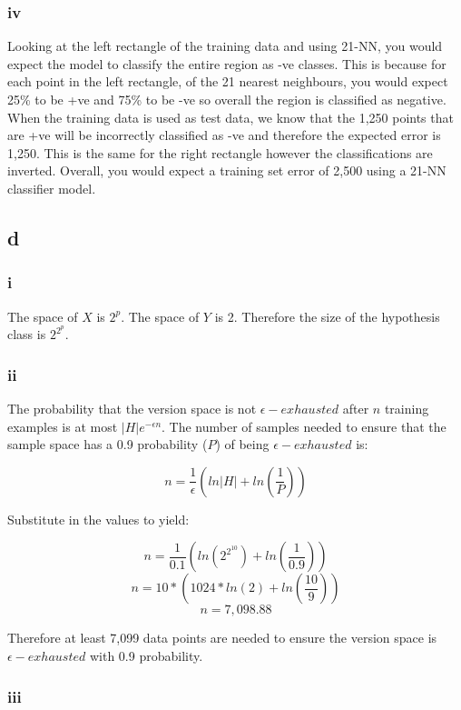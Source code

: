 \documentclass{article}
\begin{document}
\subsubsection*{iv}

Looking at the left rectangle of the training data and using 21-NN, you would expect the model to classify the entire region as -ve classes. 
This is because for each point in the left rectangle, of the 21 nearest neighbours, you would expect 25\% to be +ve and 75\% to be -ve so
overall the region is classified as negative. When the training data is used as test data, we know that the 1,250 points that are +ve will 
be incorrectly classified as -ve and therefore the expected error is 1,250. This is the same for the right rectangle however the classifications
are inverted. Overall, you would expect a training set error of 2,500 using a 21-NN classifier model.

\subsection*{d}

\subsubsection*{i}
The space of \(X\) is \(2^{p}\). The space of \(Y\) is 2. Therefore the size of the hypothesis class is \(2^{2^{p}}\).

\subsubsection*{ii}

The probability that the version space is not \(\epsilon-exhausted\) after \(n\) training examples is at most \(|H|e^{-\epsilon n}\).
The number of samples needed to ensure that the sample space has a 0.9 probability (\(P\)) of being \(\epsilon-exhausted\) is:

\[
    n = \frac{1}{\epsilon}(ln|H| + ln(\frac{1}{P}))
\]

Substitute in the values to yield:

\[
    n = \frac{1}{0.1}(ln(2^{2^{10}}) + ln(\frac{1}{0.9}))
\]
\[
    n = 10*(1024*ln(2) + ln(\frac{10}{9}))
\]
\[
    n = 7,098.88
\]

Therefore at least 7,099 data points are needed to ensure the version space is \(\epsilon-exhausted\) with 0.9 probability.

\subsubsection*{iii}
\end{document}
